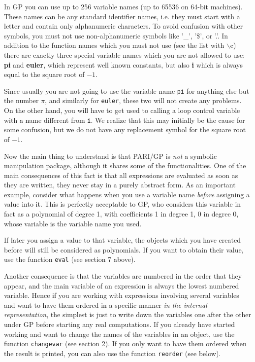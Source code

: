 In GP you can use up to 256 variable names (up to 65536 on 64-bit 
machines). These names can be any standard identifier names, i.e. they 
must start with a letter and contain only alphanumeric characters. To
avoid confusion with other symbols, you must not 
use non-alphanumeric symbols like '\_', '\$', or '.'. In addition to the
function names which you must not use (see the list with $\backslash$c) there
are exactly three special variable names which you are not allowed to use:
{\bf pi} and {\bf euler}, which represent well known constants, but also 
{\bf i} which is always equal to the square root of $-1$.

Since usually you are not going to use the variable name {\tt pi} for anything else but
the number $\pi$, and similarly for {\tt euler}, these two will not create any problems.
On the other hand, you will have to get used to calling a loop control variable
with a name different from {\tt i}. We realize that this may initially be the cause for
some confusion, but we do not have any replacement symbol for the square root of $-1$.

Now the main thing to understand is that PARI/GP is {\sl not} a symbolic manipulation
package, although it shares some of the functionalities. One of the main consequences
of this fact is that all expressions are evaluated as soon as they are written, they
never stay in a purely abstract form. As an important example, consider what happens
when you use a variable name {\sl before} assigning a value into it. This is perfectly
acceptable to GP, who considers this variable in fact as a polynomial of degree 1, with
coefficients 1 in degree 1, 0 in degree 0, whose variable is the variable name you used.

If later you assign a value to that variable, the objects which you have created before
will still be considered as polynomials. If you want to obtain their value, use the
function {\tt eval} (see section 7 above).

Another consequence is that the variables are numbered in the order
that they appear, and the main variable of an expression is always
the lowest numbered variable. Hence if you are working with expressions
involving several variables and want to have them ordered in a specific manner
{\sl in the internal representation}, the simplest is just to write down the variables
one after the other under GP before starting any real computations.
If you already have started working and want to change the names of the variables
in an object, use the function {\tt changevar} (see section 2). If you only want
to have them ordered when the result is printed, you can also use the function
{\tt reorder} (see below).

